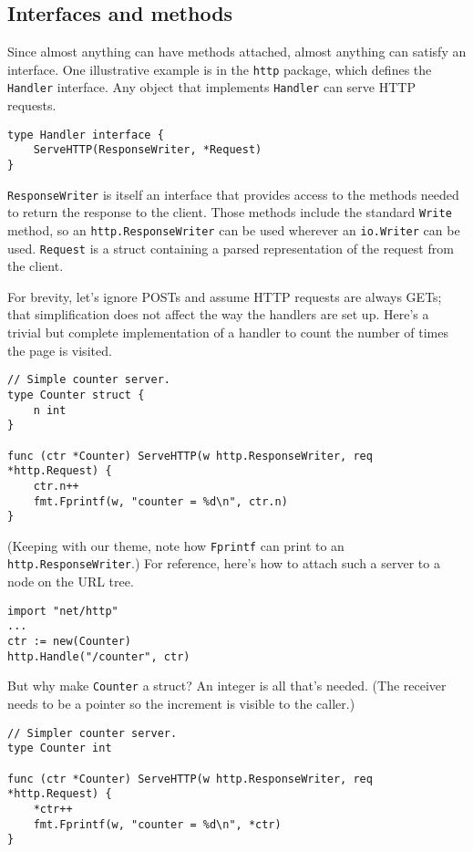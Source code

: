 \subsection*{Interfaces and methods}

Since almost anything can have methods attached, almost anything can
satisfy an interface. One illustrative example is in the \texttt{http}
package, which defines the \texttt{Handler} interface. Any object that
implements \texttt{Handler} can serve HTTP requests.

\begin{Verbatim}[frame=single]
type Handler interface {
    ServeHTTP(ResponseWriter, *Request)
}
\end{Verbatim}

\texttt{ResponseWriter} is itself an interface that provides access to
the methods needed to return the response to the client. Those methods
include the standard \texttt{Write} method, so an
\texttt{http.ResponseWriter} can be used wherever an \texttt{io.Writer}
can be used. \texttt{Request} is a struct containing a parsed
representation of the request from the client.

For brevity, let's ignore POSTs and assume HTTP requests are always
GETs; that simplification does not affect the way the handlers are set
up. Here's a trivial but complete implementation of a handler to count
the number of times the page is visited.

\begin{Verbatim}[frame=single]
// Simple counter server.
type Counter struct {
    n int
}

func (ctr *Counter) ServeHTTP(w http.ResponseWriter, req *http.Request) {
    ctr.n++
    fmt.Fprintf(w, "counter = %d\n", ctr.n)
}
\end{Verbatim}

(Keeping with our theme, note how \texttt{Fprintf} can print to an
\texttt{http.ResponseWriter}.) For reference, here's how to attach such
a server to a node on the URL tree.

\begin{Verbatim}[frame=single]
import "net/http"
...
ctr := new(Counter)
http.Handle("/counter", ctr)
\end{Verbatim}

But why make \texttt{Counter} a struct? An integer is all that's needed.
(The receiver needs to be a pointer so the increment is visible to the
caller.)

\begin{Verbatim}[frame=single]
// Simpler counter server.
type Counter int

func (ctr *Counter) ServeHTTP(w http.ResponseWriter, req *http.Request) {
    *ctr++
    fmt.Fprintf(w, "counter = %d\n", *ctr)
}
\end{Verbatim}

